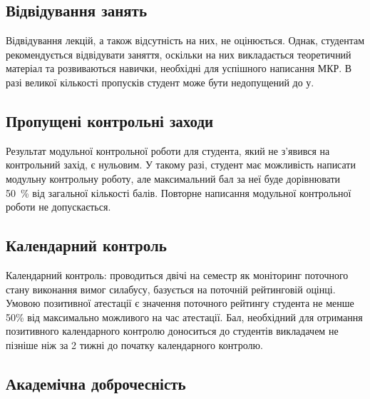 \documentclass{Syllabus}
\begin{document}
\subsection*{Відвідування занять}
Відвідування лекцій, а також відсутність на них, не оцінюється. Однак, студентам рекомендується відвідувати заняття, оскільки на них викладається теоретичний матеріал та розвиваються навички, необхідні для успішного написання МКР. В разі великої кількості пропусків студент може бути недопущений до \control у.

\subsection*{Пропущені контрольні заходи}

Результат модульної контрольної роботи для студента, який не з’явився на контрольний захід, є нульовим. У такому разі, студент має можливість написати модульну контрольну роботу, але максимальний бал за неї буде дорівнювати 50~\% від загальної кількості балів. Повторне написання модульної контрольної роботи не допускається.

\subsection*{Календарний контроль}

Календарний контроль: проводиться двічі на семестр як моніторинг поточного стану виконання вимог силабусу,  базується на поточній рейтинговій оцінці. Умовою позитивної атестації є значення поточного рейтингу студента не менше 50\% від максимально можливого на час атестації. Бал, необхідний для отримання позитивного календарного контролю доноситься до студентів викладачем не пізніше ніж за 2 тижні до початку календарного контролю.


\subsection*{Академічна доброчесність}
\end{document}
